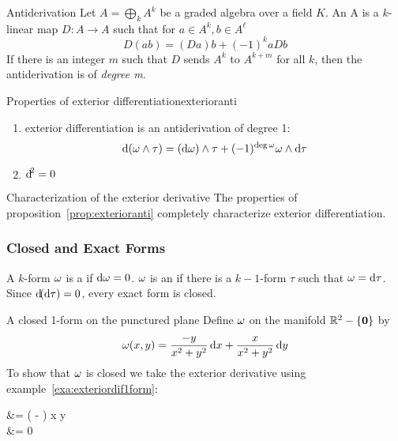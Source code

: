 \begin{definition}{Antiderivation}
    Let \(A = \bigoplus_k A^k\) be a graded algebra over a field \(K\). An  A is a \(k\)-linear map \(D \colon A \rightarrow A\) such that for \(a \in A^k, b \in A^\ell\)
    \begin{equation}
        D(ab) = (Da)b + (-1)^kaDb
    \end{equation}
    If there is an integer \(m\) such that \(D\) sends \(A^k\) to \(A^{k+m}\) for all \(k\), then the antiderivation is of \textit{degree m}.
\end{definition}
%
\begin{proposition}{Properties of exterior differentiation}{exterioranti}
    \begin{enumerate}
        \item exterior differentiation is an antiderivation of degree 1:
              \[\dif\, (\w \wedge \tau) = (\dif \w) \wedge \tau + (-1)^{\deg \omega} \omega \wedge \dif \tau\]
        \item \(\dif^2 = 0\)
    \end{enumerate}
\end{proposition}
%
\begin{proposition}{Characterization of the exterior derivative}{}
    The properties of proposition~\eqref{prop:exterioranti} completely characterize exterior differentiation.
\end{proposition}

\subsubsection{Closed and Exact Forms}

A \(k\)-form \(\omega\) is a  if \(\dif \w = 0\).
%
\(\omega\) is an  if there is a \(k-1\)-form \(\tau\) such that \(\w = \dif \tau\).
%
Since \(\dif (\dif \tau) = 0\), every exact form is closed.

\begin{example}{A closed 1-form on the punctured plane}{}
    Define \(\omega\) on the manifold \(\mathbb{R}^2-\{\bm{0}\}\) by
    \[
        \omega(x,y) = \frac{-y}{x^2+y^2}\dif x + \frac{x}{x^2+y^2}\dif y
    \]
    To show that \(\omega\) is closed we take the exterior derivative using example~\eqref{exa:exteriordif1form}:
    \begin{splitenv}
        \dif \w &= \left(  -  \right) \dif x \wedge \dif y \\
        &= 0
    \end{splitenv}
\end{example}

